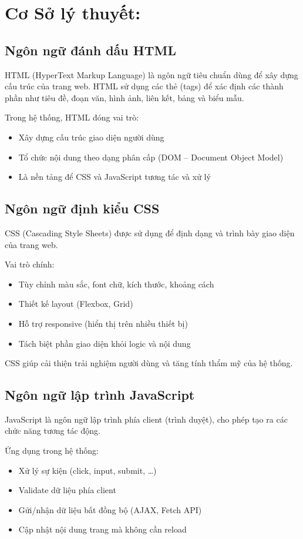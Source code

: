 \documentclass[pt = 12,a4paper]{article}
\begin{document}
\section{Cơ Sở lý thuyết:}
\subsection{Ngôn ngữ đánh dấu HTML}
HTML (HyperText Markup Language) là ngôn ngữ tiêu chuẩn dùng để xây dựng cấu trúc của trang web. HTML sử dụng các thẻ (tags) để xác định các thành phần như tiêu đề, đoạn văn, hình ảnh, liên kết, bảng và biểu mẫu.

Trong hệ thống, HTML đóng vai trò:
\begin{itemize}
    \item Xây dựng cấu trúc giao diện người dùng
    \item Tổ chức nội dung theo dạng phân cấp (DOM -- Document Object Model)
    \item Là nền tảng để CSS và JavaScript tương tác và xử lý
\end{itemize}

\subsection{Ngôn ngữ định kiểu CSS}
CSS (Cascading Style Sheets) được sử dụng để định dạng và trình bày giao diện của trang web.

Vai trò chính:
\begin{itemize}
    \item Tùy chỉnh màu sắc, font chữ, kích thước, khoảng cách
    \item Thiết kế layout (Flexbox, Grid)
    \item Hỗ trợ responsive (hiển thị trên nhiều thiết bị)
    \item Tách biệt phần giao diện khỏi logic và nội dung
\end{itemize}

CSS giúp cải thiện trải nghiệm người dùng và tăng tính thẩm mỹ của hệ thống.

\subsection{Ngôn ngữ lập trình JavaScript}
JavaScript là ngôn ngữ lập trình phía client (trình duyệt), cho phép tạo ra các chức năng tương tác động.

Ứng dụng trong hệ thống:
\begin{itemize}
    \item Xử lý sự kiện (click, input, submit, \ldots)
    \item Validate dữ liệu phía client
    \item Gửi/nhận dữ liệu bất đồng bộ (AJAX, Fetch API)
    \item Cập nhật nội dung trang mà không cần reload
\end{itemize}
\end{document}
